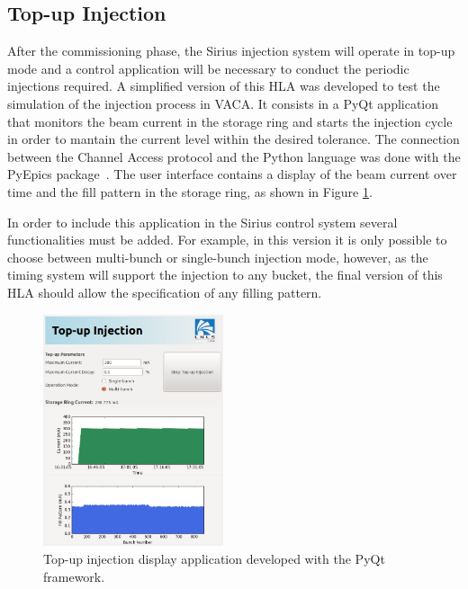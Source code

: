 \subsection{Top-up Injection}

After the commissioning phase, the Sirius injection system will operate in top-up mode 
and a control application will be necessary to conduct the periodic injections required.
A simplified version of this HLA was developed to test the simulation of the injection process in VACA.
It consists in a PyQt application that monitors the beam current in the storage ring and starts the injection cycle
in order to mantain the current level within the desired tolerance. The connection between 
the Channel Access protocol and the Python language was done with the PyEpics package~\cite{pyepics}.
The user interface contains a display of the beam current over time and the fill pattern in the storage ring, as shown in Figure \ref{fig:topup}.

In order to include this application in the Sirius control system several functionalities must be added. For example, in this version it is only possible to 
choose between multi-bunch or single-bunch injection mode, however, as the timing system will support the injection to any bucket, 
the final version of this HLA should allow the specification of any filling pattern.


\begin{figure}[!htb]
   \centering
   \includegraphics*[width=150pt]{WEPOPRPO22f4}
   \caption{Top-up injection display application developed with the PyQt framework.}
   \label{fig:topup}
\end{figure}

